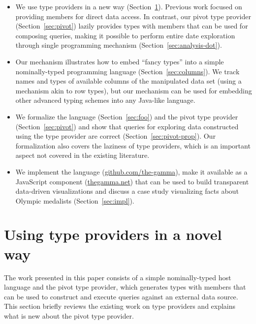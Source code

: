 \documentclass[a4paper,UKenglish]{lipics-v2016}
\theoremstyle{plain}
\theoremstyle{definition}
\begin{document}
\begin{itemize}
\item We use type providers in a new way (Section~\ref{sec:tps}). Previous work focused on providing 
  members for direct data access. In contrast, our pivot type provider (Section~\ref{sec:pivot}) lazily 
  provides types with members that can be used for composing queries, making it possible to perform
  entire date exploration through single programming mechanism (Section~\ref{sec:analysis-dot}).  

\item Our mechanism illustrates how to embed ``fancy types'' \cite{fancytypes} into a simple nominally-typed programming  
  language (Section~\ref{sec:columns}). We track names and types of available columns of the 
  manipulated data set (using a mechanism akin to row types), but our mechanism can be used for 
  embedding other advanced typing schemes into any Java-like language.
  
\item We formalize the language (Section~\ref{sec:foo}) and the pivot type provider (Section~\ref{sec:pivot}) 
  and show that queries for exploring data constructed using the type provider are correct
  (Section~\ref{sec:pivot-prop}). Our formalization also covers the laziness of type providers, which
  is an important aspect not covered in the existing literature.

\item We implement the language (\url{github.com/the-gamma}), make it available as a JavaScript 
  component (\url{thegamma.net}) that can be used to build transparent data-driven visualizations 
  and discuss a case study visualizing facts about Olympic medalists (Section~\ref{sec:impl}).
\end{itemize}


\section{Using type providers in a novel way}
\label{sec:tps}

The work presented in this paper consists of a simple nominally-typed host language and the pivot
type provider, which generates types with members that can be used to construct and execute queries
against an external data source. This section briefly reviews the existing work on type providers
and explains what is new about the pivot type provider.
\end{document}
